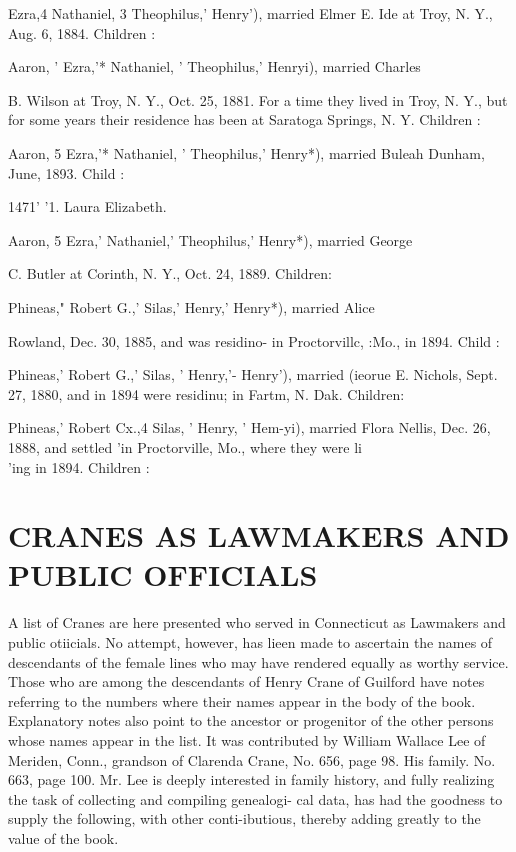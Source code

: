 \documentclass{book}
\begin{document}
Ezra,4 Nathaniel, 3 Theophilus,' Henry'), married Elmer E. Ide 
at Troy, N. Y., Aug. 6, 1884. Children : 





Aaron, ' Ezra,'* Nathaniel, ' Theophilus,' Henryi), married Charles 

B. Wilson at Troy, N. Y., Oct. 25, 1881. For a time they lived 
in Troy, N. Y., but for some years their residence has been at 
Saratoga Springs, N. Y. Children : 




Aaron, 5 Ezra,'* Nathaniel, ' Theophilus,' Henry*), married Buleah 
Dunham, June, 1893. Child : 

1471'  '1. Laura Elizabeth. 

Aaron, 5 Ezra,' Nathaniel,' Theophilus,' Henry*), married George 

C. Butler at Corinth, N. Y., Oct. 24, 1889. Children: 



Phineas," Robert G.,' Silas,' Henry,' Henry*), married Alice 




Rowland, Dec. 30, 1885, and was residino- in Proctorvillc, :Mo., 
in 1894. Child : 


Phineas,' Robert G.,' Silas, ' Henry,'- Henry'), married (ieorue 
E. Nichols, Sept. 27, 1880, and in 1894 were residinu; in Fartm, 
N. Dak. Children: 





Phineas,' Robert Cx.,4 Silas, ' Henry, ' Hem-yi), married Flora 
Nellis, Dec. 26, 1888, and settled 'in Proctorville, Mo., where 
they were li\\'ing in 1894. Children : 




\chapter{CRANES AS LAWMAKERS AND PUBLIC OFFICIALS}



A list of Cranes are here presented who served in Connecticut 
as Lawmakers and public otiicials. No attempt, however, has 
lieen made to ascertain the names of descendants of the female 
lines who may have rendered equally as worthy service. Those 
who are among the descendants of Henry Crane of Guilford have 
notes referring to the numbers where their names appear in the 
body of the book. Explanatory notes also point to the ancestor 
or progenitor of the other persons whose names appear in the list. 
It was contributed by William Wallace Lee of Meriden, Conn., 
grandson of Clarenda Crane, No. 656, page 98. His family. No. 
663, page 100. Mr. Lee is deeply interested in family history, 
and fully realizing the task of collecting and compiling genealogi- 
cal data, has had the goodness to supply the following, with other 
conti-ibutious, thereby adding greatly to the value of the book. 
\end{document}

